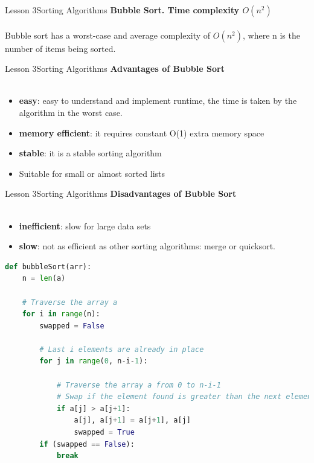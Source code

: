 \documentclass[aspectratio=1610]{beamer}
\begin{document}
\begin{frame}{Lesson 3}{Sorting Algorithms}
\LARGE
\textbf{Bubble Sort. Time complexity $O(n^2)$}\\~\\
Bubble sort has a worst-case and average complexity of $O(n^2)$, where 
n is the number of items being sorted.
\end{frame}


\begin{frame}{Lesson 3}{Sorting Algorithms}
\LARGE
\textbf{Advantages of Bubble Sort}\\~\\
\Large
\begin{itemize}
	\item \textbf{easy}: easy to understand and implement
 runtime, the time is taken by the algorithm in the worst case.
	\item \textbf{memory efficient}: it requires constant O(1) extra memory space
	\item \textbf{stable}: it is a stable sorting algorithm
	\item Suitable for small or almost sorted lists
\end{itemize}
\end{frame}


\begin{frame}{Lesson 3}{Sorting Algorithms}
\LARGE
\textbf{Disadvantages of Bubble Sort}\\~\\
\Large
\begin{itemize}
	\item \textbf{inefficient}: slow for large data sets
	\item \textbf{slow}: not as efficient as other sorting algorithms: merge or quicksort.
\end{itemize}

\end{frame}


\begin{frame}[fragile]
\begin{lstlisting}[language=Python]
def bubbleSort(arr):
    n = len(a)
    
    # Traverse the array a
    for i in range(n):
        swapped = False

        # Last i elements are already in place
        for j in range(0, n-i-1):

            # Traverse the array a from 0 to n-i-1
            # Swap if the element found is greater than the next element
            if a[j] > a[j+1]:
                a[j], a[j+1] = a[j+1], a[j]
                swapped = True
        if (swapped == False):
            break
\end{lstlisting}
\end{frame}
\end{document}
